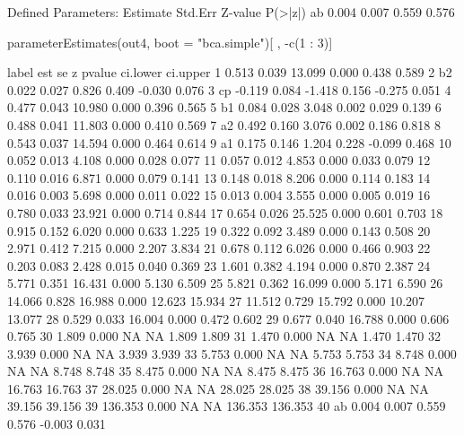 \begin{Schunk}
\begin{Soutput}
Defined Parameters:
                   Estimate  Std.Err  Z-value  P(>|z|)
    ab                0.004    0.007    0.559    0.576
\end{Soutput}
\begin{Sinput}
 parameterEstimates(out4, boot = "bca.simple")[ , -c(1 : 3)]
\end{Sinput}
\begin{Soutput}
   label     est    se      z pvalue ci.lower ci.upper
1          0.513 0.039 13.099  0.000    0.438    0.589
2     b2   0.022 0.027  0.826  0.409   -0.030    0.076
3     cp  -0.119 0.084 -1.418  0.156   -0.275    0.051
4          0.477 0.043 10.980  0.000    0.396    0.565
5     b1   0.084 0.028  3.048  0.002    0.029    0.139
6          0.488 0.041 11.803  0.000    0.410    0.569
7     a2   0.492 0.160  3.076  0.002    0.186    0.818
8          0.543 0.037 14.594  0.000    0.464    0.614
9     a1   0.175 0.146  1.204  0.228   -0.099    0.468
10         0.052 0.013  4.108  0.000    0.028    0.077
11         0.057 0.012  4.853  0.000    0.033    0.079
12         0.110 0.016  6.871  0.000    0.079    0.141
13         0.148 0.018  8.206  0.000    0.114    0.183
14         0.016 0.003  5.698  0.000    0.011    0.022
15         0.013 0.004  3.555  0.000    0.005    0.019
16         0.780 0.033 23.921  0.000    0.714    0.844
17         0.654 0.026 25.525  0.000    0.601    0.703
18         0.915 0.152  6.020  0.000    0.633    1.225
19         0.322 0.092  3.489  0.000    0.143    0.508
20         2.971 0.412  7.215  0.000    2.207    3.834
21         0.678 0.112  6.026  0.000    0.466    0.903
22         0.203 0.083  2.428  0.015    0.040    0.369
23         1.601 0.382  4.194  0.000    0.870    2.387
24         5.771 0.351 16.431  0.000    5.130    6.509
25         5.821 0.362 16.099  0.000    5.171    6.590
26        14.066 0.828 16.988  0.000   12.623   15.934
27        11.512 0.729 15.792  0.000   10.207   13.077
28         0.529 0.033 16.004  0.000    0.472    0.602
29         0.677 0.040 16.788  0.000    0.606    0.765
30         1.809 0.000     NA     NA    1.809    1.809
31         1.470 0.000     NA     NA    1.470    1.470
32         3.939 0.000     NA     NA    3.939    3.939
33         5.753 0.000     NA     NA    5.753    5.753
34         8.748 0.000     NA     NA    8.748    8.748
35         8.475 0.000     NA     NA    8.475    8.475
36        16.763 0.000     NA     NA   16.763   16.763
37        28.025 0.000     NA     NA   28.025   28.025
38        39.156 0.000     NA     NA   39.156   39.156
39       136.353 0.000     NA     NA  136.353  136.353
40    ab   0.004 0.007  0.559  0.576   -0.003    0.031
\end{Soutput}
\end{Schunk}
